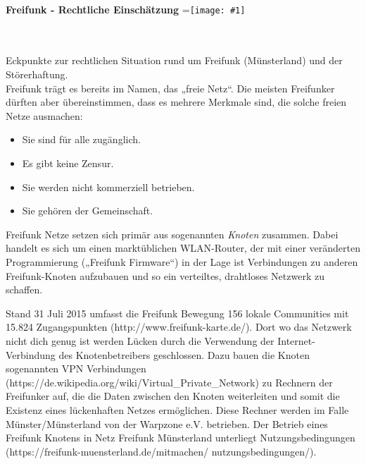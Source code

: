 \documentclass{article}
\begin{document}
\pagestyle{fancy}
\renewcommand{\headrulewidth}{0pt}
\fancyhf{
\fancyhead[LE,RO]{\color[rgb]{0.8627,0,0.4039}\noindent\makebox[\linewidth]{\rule{\paperwidth}{36pt}}}
\fancyfoot[LE,RO]{\color[rgb]{0.8627,0,0.4039}\noindent\makebox[\linewidth]{\rule{\paperwidth}{36pt}}}}
\newcommand{\vcenteredinclude}[1]{\begingroup
\setbox0=\hbox{\texttt{[image: \#1]}}%
\parbox{\wd0}{\box0}\endgroup}
\vspace{0.5cm}\ \\
	\textbf{\Huge
	Freifunk - Rechtliche Einschätzung} \hfill\vcenteredinclude{Vorlagen/logo-gt.png}\\
\vspace{0.5cm}\ \\

Eckpunkte zur rechtlichen Situation rund um Freifunk (Münsterland) und der Störerhaftung. \\
Freifunk trägt es bereits im Namen, das „freie Netz“. Die meisten Freifunker dürften aber übereinstimmen, dass es mehrere Merkmale sind, die solche freien Netze ausmachen:
\begin{itemize}
	\item Sie sind für alle zugänglich.
	\item Es gibt keine Zensur.
	\item Sie werden nicht kommerziell betrieben.
	\item Sie gehören der Gemeinschaft.
\end{itemize}

Freifunk Netze setzen sich primär aus sogenannten \emph{Knoten} zusammen. 
Dabei handelt es sich um einen marktüblichen WLAN-Router, der mit einer veränderten Programmierung („Freifunk Firmware“) in der Lage ist Verbindungen zu anderen Freifunk-Knoten aufzubauen und so ein verteiltes, drahtloses Netzwerk zu schaffen.

Stand 31 Juli 2015 umfasst die Freifunk Bewegung 156 lokale Communities mit 15.824 Zugangspunkten (http://www.freifunk-karte.de/). 
Dort wo das Netzwerk nicht dich genug ist werden Lücken durch die Verwendung der Internet-Verbindung des Knotenbetreibers geschlossen. 
Dazu bauen die Knoten sogenannten VPN Verbindungen (https://de.wikipedia.org/wiki/Virtual\_Private\_Network) zu Rechnern der Freifunker auf, die die Daten zwischen den Knoten weiterleiten und somit die Existenz eines lückenhaften Netzes ermöglichen. Diese Rechner werden im Falle Münster/Münsterland von der Warpzone e.V. betrieben.  Der Betrieb eines Freifunk Knotens in Netz Freifunk Münsterland unterliegt Nutzungsbedingungen (https://freifunk-muensterland.de/mitmachen/ nutzungsbedingungen/).
\end{document}
